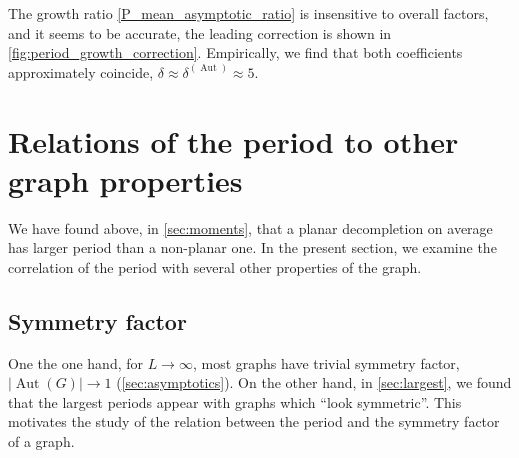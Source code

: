 \documentclass[11pt,a4paper]{article}
\newcommand{\abs}[1]{\lvert #1 \rvert}
\newcommand{\Aut}{\operatorname{Aut}}
\renewcommand{\|}{\rule[-0.4ex]{0.2ex}{1.2em}}
\begin{document}
The growth ratio \cref{P_mean_asymptotic_ratio} is insensitive to overall factors, and it seems to be accurate, the leading correction is shown in \cref{fig:period_growth_correction}. Empirically, we find that both coefficients approximately coincide, $\delta \approx \delta^{(\Aut)}\approx 5$.








\FloatBarrier





\section{Relations of the period to other graph properties}\label{sec:relations}

We have found above, in \cref{sec:moments}, that a planar decompletion on average has larger period than a non-planar one. In the present section, we examine the correlation of the period with several other properties of the graph.





\subsection{Symmetry factor}\label{sec:relations_symmetry_factor}


One the one hand, for $L\rightarrow \infty$, most graphs have trivial symmetry factor, $\abs{\Aut(G)}\rightarrow 1$ (\cref{sec:asymptotics}). On the other hand, in \cref{sec:largest}, we found that the largest periods appear with graphs which \enquote{look symmetric}. This motivates the study of the relation between the period and the symmetry factor of a graph.
\end{document}
